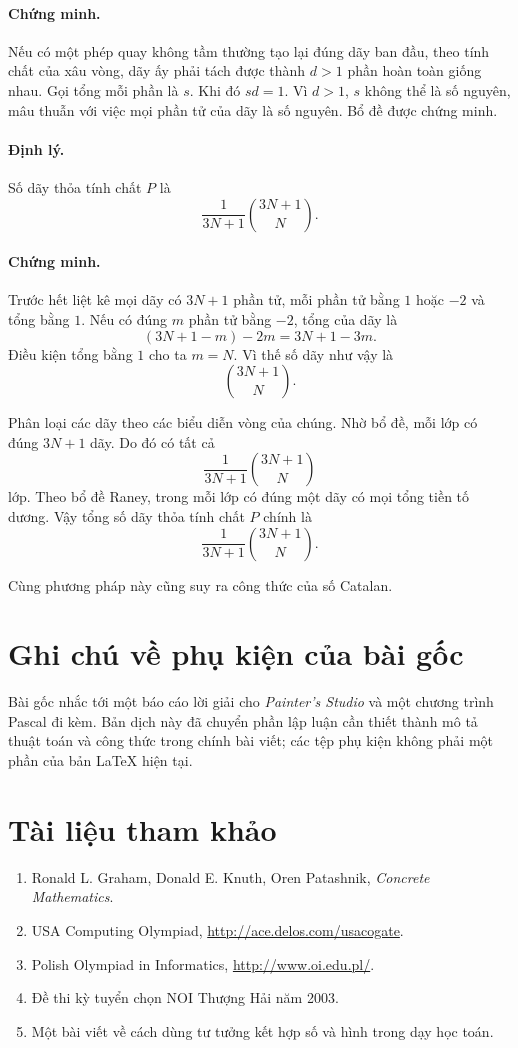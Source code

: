 \documentclass[11pt]{article}
\begin{document}
\paragraph{Chứng minh.}
Nếu có một phép quay không tầm thường tạo lại đúng dãy ban đầu, theo tính
chất của xâu vòng, dãy ấy phải tách được thành $d>1$ phần hoàn toàn giống
nhau. Gọi tổng mỗi phần là $s$. Khi đó $sd=1$. Vì $d>1$, $s$ không thể là số
nguyên, mâu thuẫn với việc mọi phần tử của dãy là số nguyên. Bổ đề được chứng
minh.

\paragraph{Định lý.}
Số dãy thỏa tính chất $P$ là
\[
  \frac{1}{3N+1}\binom{3N+1}{N}.
\]

\paragraph{Chứng minh.}
Trước hết liệt kê mọi dãy có $3N+1$ phần tử, mỗi phần tử bằng $1$ hoặc $-2$
và tổng bằng $1$. Nếu có đúng $m$ phần tử bằng $-2$, tổng của dãy là
\[
  (3N+1-m)-2m=3N+1-3m.
\]
Điều kiện tổng bằng $1$ cho ta $m=N$. Vì thế số dãy như vậy là
\[
  \binom{3N+1}{N}.
\]

Phân loại các dãy theo các biểu diễn vòng của chúng. Nhờ bổ đề, mỗi lớp có
đúng $3N+1$ dãy. Do đó có tất cả
\[
  \frac{1}{3N+1}\binom{3N+1}{N}
\]
lớp. Theo bổ đề Raney, trong mỗi lớp có đúng một dãy có mọi tổng tiền tố
dương. Vậy tổng số dãy thỏa tính chất $P$ chính là
\[
  \frac{1}{3N+1}\binom{3N+1}{N}.
\]

Cùng phương pháp này cũng suy ra công thức của số Catalan.

\section{Ghi chú về phụ kiện của bài gốc}

Bài gốc nhắc tới một báo cáo lời giải cho \textit{Painter's Studio} và một
chương trình Pascal đi kèm. Bản dịch này đã chuyển phần lập luận cần thiết
thành mô tả thuật toán và công thức trong chính bài viết; các tệp phụ kiện
không phải một phần của bản LaTeX hiện tại.

\section{Tài liệu tham khảo}

\begin{enumerate}
  \item Ronald L. Graham, Donald E. Knuth, Oren Patashnik,
  \textit{Concrete Mathematics}.
  \item USA Computing Olympiad, \url{http://ace.delos.com/usacogate}.
  \item Polish Olympiad in Informatics, \url{http://www.oi.edu.pl/}.
  \item Đề thi kỳ tuyển chọn NOI Thượng Hải năm 2003.
  \item Một bài viết về cách dùng tư tưởng kết hợp số và hình trong dạy học
  toán.
\end{enumerate}
\end{document}
